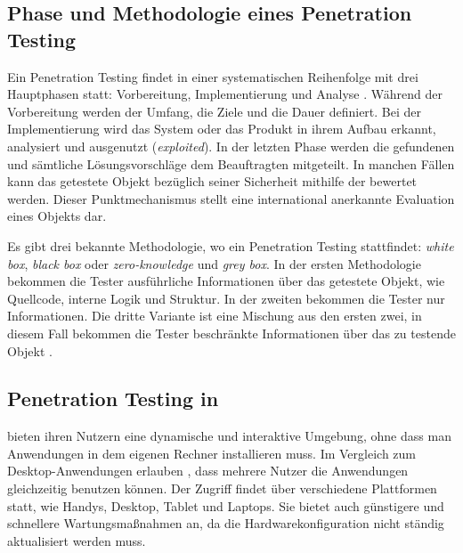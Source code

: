 \subsection{Phase und Methodologie eines Penetration Testing}

Ein Penetration Testing findet in einer systematischen Reihenfolge mit drei Hauptphasen statt: Vorbereitung, Implementierung und Analyse \citep{Hessa_study_pentesting}. Während der Vorbereitung werden der Umfang, die Ziele und die Dauer definiert. Bei der Implementierung wird das System oder das Produkt in ihrem Aufbau erkannt, analysiert und ausgenutzt (\textit{exploited}). In der letzten Phase werden die gefundenen  und sämtliche Lösungsvorschläge dem Beauftragten mitgeteilt. In manchen Fällen kann das getestete Objekt bezüglich seiner Sicherheit mithilfe der  bewertet werden. Dieser Punktmechanismus stellt eine international anerkannte Evaluation eines Objekts dar. 

Es gibt drei bekannte Methodologie, wo ein Penetration Testing stattfindet: \textit{white box}, \textit{black box} oder \textit{zero-knowledge} und \textit{grey box}. In der ersten Methodologie bekommen die Tester ausführliche Informationen über das getestete Objekt, wie Quellcode, interne Logik und Struktur. In der zweiten bekommen die Tester nur  Informationen. Die dritte Variante ist eine Mischung aus den ersten zwei, in diesem Fall bekommen die Tester beschränkte Informationen über das zu testende Objekt \citep{Ehmer_methoden_testen}.




\subsection{Penetration Testing in }

 bieten ihren Nutzern eine dynamische und interaktive Umgebung, ohne dass man Anwendungen in dem eigenen Rechner installieren muss. Im Vergleich zum Desktop-Anwendungen erlauben , dass mehrere Nutzer die Anwendungen gleichzeitig benutzen können. Der Zugriff findet über verschiedene Plattformen statt, wie Handys, Desktop, Tablet und Laptops. Sie bietet auch günstigere und schnellere Wartungsmaßnahmen an, da die Hardwarekonfiguration nicht ständig aktualisiert werden muss\citep{webapp}. 

